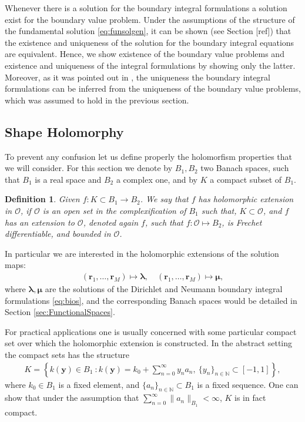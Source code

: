 \documentclass{article}
\newtheorem{definition}[theorem]{Definition}
\newcommand{\todo}[1]{{\color{red}[#1]}}
\newcommand{\cO}{\mathcal O}
\newcommand{\bmu} {\bm{\mu}}
\newcommand{\IN}{{\mathbb N}}
\newcommand{\bla}{\boldsymbol \lambda}
\newcommand{\br}{\bm{r}}
\newcommand{\by}{\bm{y}}
\begin{document}
Whenever there is a solution for the boundary integral formulations a solution exist for the boundary value problem. Under the assumptions of the 
structure of the fundamental solution \eqref{eq:funsolgen}, it can be shown (see Section \todo{ref}) that the existence and uniqueness of the solution for the boundary integral equations are equivalent. Hence, we show existence of the boundary value problems and  existence and uniqueness of the integral formulations by showing only  the latter. Moreover, as it was pointed out in \cite{JHP20}, the uniqueness the boundary integral formulations can be inferred from the uniqueness of the boundary value problems, which was assumed to hold in the previous section. 

\subsection{Shape Holomorphy}
\label{section:ShapeHolormsGeneral}

To prevent any confusion let us define properly the holomorfism properties that we will consider. For this section we denote by $B_1,B_2$ two Banach spaces, such that $B_1$ is a real space and $B_2$ a complex one, and by $K$ a compact subset of $B_1$. 

\begin{definition}
\label{def:holmrfextension}
Given $f :K \subset B_1 \rightarrow B_2$. We say that $f$ has holomorphic extension in $\cO$, if $\cO$ is an open set in the complexification of $B_1$ such that, $K \subset \cO$, and $f$ has an extension to $\cO$, denoted again $f$, such that $f : \cO \mapsto B_2$, is Frechet differentiable, and bounded in $\cO$.
\end{definition}

In particular we are interested in the holomorphic extensions of the solution maps: 
\begin{align*}
(\br_1,\hdots,\br_M) \mapsto \bla, \quad (\br_1,\hdots,\br_M) \mapsto \bmu,
\end{align*}
where $\bla,\bmu$ are the solutions of the Dirichlet and Neumann boundary integral formulations \eqref{eq:bios}, and the corresponding Banach spaces would be detailed in Section \ref{sec:FunctionalSpaces}.

For practical applications one is usually concerned with some particular compact set over which the holomorphic extension is constructed. In the abstract setting the compact sets has the structure 
\begin{align}
\label{eq:Kcompact}
K =\left\lbrace k(\by) \in B_1 \ : k(\by) = k_0 + \sum_{n=0}^\infty y_n a_n, \ \{y_n\}_{n \in \IN} \subset [-1,1] \right\rbrace,
\end{align}
where $k_0 \in B_1$ is a fixed element, and $\{a_n\}_{n\in \IN} \subset B_1$ is  a fixed sequence. One can show that under the assumption that $\sum_{n=0}^\infty \|a_n\|_{B_1} < \infty$, $K$ is in fact compact. 
\end{document}

